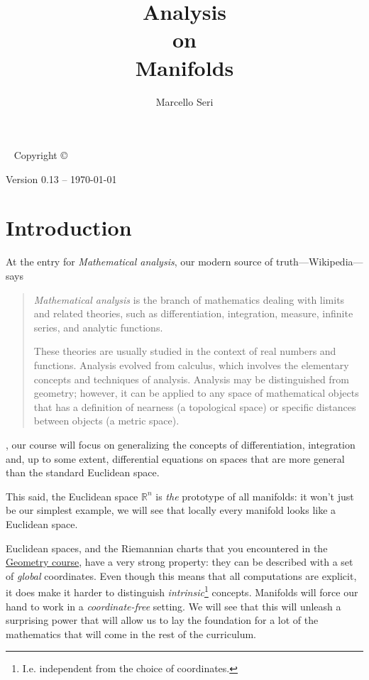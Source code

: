 \documentclass[nobib, a4paper]{tufte-book}
\title{Analysis\\ \noindent
  on\\ \noindent
  Manifolds
}
\author{Marcello Seri}
\theoremstyle{plain}
\theoremstyle{definition}
\theoremstyle{remark}
\newcommand{\R}{\mathbb{R}}
\begin{document}
\maketitlepage

\newpage

\begin{fullwidth}
  ~\vfill
  \thispagestyle{empty}
  \setlength{\parindent}{0pt}
  \setlength{\parskip}{\baselineskip}
  Copyright \copyright\ \the\year\ \thanklessauthor

  \par Version 0.13 -- \today

  \vfill
  \small{\doclicenseThis}
\end{fullwidth}

\tableofcontents
\cleardoublepage

\chapter*{Introduction}

At the entry for \emph{Mathematical analysis}, our modern source of truth---Wikipedia---says

\begin{quotation}
  \emph{Mathematical analysis} is the branch of mathematics dealing with limits and related theories, such as differentiation, integration, measure, infinite series, and analytic functions.

  These theories are usually studied in the context of real numbers and functions. Analysis evolved from calculus, which involves the elementary concepts and techniques of analysis. Analysis may be distinguished from geometry; however, it can be applied to any space of mathematical objects that has a definition of nearness (a topological space) or specific distances between objects (a metric space). 
\end{quotation}

, our course will focus on generalizing the concepts of differentiation, integration and, up to some extent, differential equations on spaces that are more general than the standard Euclidean space.

This said, the Euclidean space $\R^n$ is \emph{the} prototype of all manifolds: it won't just be our simplest example, we will see that locally every manifold looks like a Euclidean space.

Euclidean spaces, and the Riemannian charts that you encountered in the \href{http://www.rolandvdv.nl/G20/}{Geometry course}, have a very strong property: they can be described with a set of \emph{global} coordinates.
Even though this means that all computations are explicit, it does make it harder to distinguish \emph{intrinsic}\footnote{I.e. independent from the choice of coordinates.} concepts.
Manifolds will force our hand to work in a \emph{coordinate-free} setting.
We will see that this will unleash a surprising power that will allow us to lay the foundation for a lot of the mathematics that will come in the rest of the curriculum.
\end{document}
